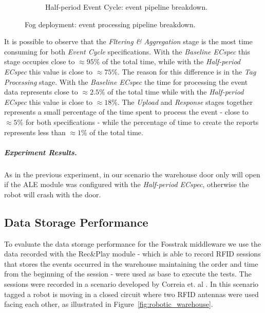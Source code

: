 \begin{figure}[ht!]
\begin{subfigure}{.5\textwidth}
            \caption{Half-period Event Cycle: event pipeline breakdown.}
            \label{fig:ecspec_effective_half}
          \end{subfigure}
          \caption[Fog deployment: event processing breakdown.]{Fog deployment: event processing pipeline breakdown.}
          \label{fig:ecspec_effective_breakdown}
        \end{figure}

        It is possible to observe that the \textit{Fltering \& Aggregation} stage is the most time consuming
        for both \textit{Event Cycle} specifications. With the \textit{Baseline ECspec} this stage occupies
        close to $\approx95\%$ of the total time, while with the \textit{Half-period ECspec} this value is
        close to $\approx75\%$. The reason for this difference is in the \textit{Tag Processing} stage.
        With the \textit{Baseline ECspec} the time for processing the event data represents close to $\approx2.5\%$
        of the total time while with the \textit{Half-period ECspec} this value is close to $\approx18\%$.
        The \textit{Upload} and \textit{Response} stages together represents a small percentage of
        the time spent to process the event - close to $\approx5\%$ for both specifications - while the percentage
        of time to create the reports represents less than $\approx1\%$ of the total time.

        \subparagraph{Experiment Results.}
        \label{subp:fog_experiment_result}
        As in the previous experiment, in our scenario the warehouse door only will open if the \gls{ALE}
        module was configured with the \textit{Half-period ECspec}, otherwise the robot will crash with
        the door.

        \subsection{Data Storage Performance}
        \label{sub:eval_exp_data}
        To evaluate the data storage performance for the Fosstrak middleware we use the data recorded with the Rec\&Play
        module - which is able to record \gls{RFID} sessions that stores the events occurred in the warehouse
        maintaining the order and time from the beginning of the session - were used as base to execute
        the tests. The sessions were recorded in a scenario developed by Correia et. al \cite{Correia:Thesis:2014}.
        In this scenario tagged a robot is moving in a closed circuit where two \gls{RFID} antennas were used
        facing each other, as illustrated in Figure~\ref{fig:robotic_warehouse}.\\

